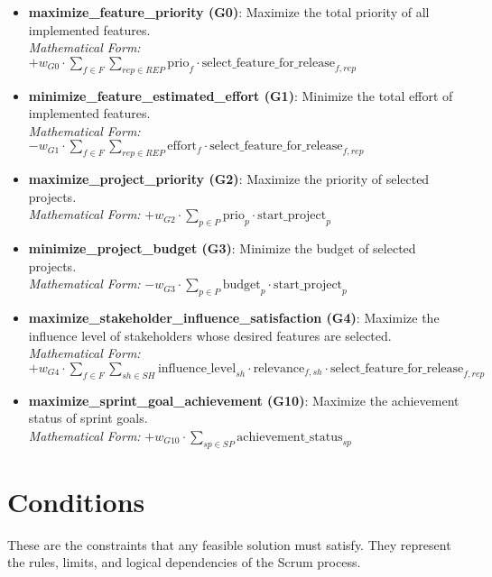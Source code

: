 \documentclass[11pt, a4paper]{article}
\begin{document}
\begin{itemize}
    \item \textbf{maximize\_feature\_priority (G0)}: Maximize the total priority of all implemented features.
    \\ \textit{Mathematical Form:} $+ w_{G0} \cdot \sum_{f \in F} \sum_{rep \in REP} \text{prio}_{f} \cdot \text{select\_feature\_for\_release}_{f,rep}$

    \item \textbf{minimize\_feature\_estimated\_effort (G1)}: Minimize the total effort of implemented features.
    \\ \textit{Mathematical Form:} $- w_{G1} \cdot \sum_{f \in F} \sum_{rep \in REP} \text{effort}_{f} \cdot \text{select\_feature\_for\_release}_{f,rep}$
    
    \item \textbf{maximize\_project\_priority (G2)}: Maximize the priority of selected projects.
    \\ \textit{Mathematical Form:} $+ w_{G2} \cdot \sum_{p \in P} \text{prio}_{p} \cdot \text{start\_project}_{p}$
    
    \item \textbf{minimize\_project\_budget (G3)}: Minimize the budget of selected projects.
    \\ \textit{Mathematical Form:} $- w_{G3} \cdot \sum_{p \in P} \text{budget}_{p} \cdot \text{start\_project}_{p}$
    
    \item \textbf{maximize\_stakeholder\_influence\_satisfaction (G4)}: Maximize the influence level of stakeholders whose desired features are selected.
    \\ \textit{Mathematical Form:} $+ w_{G4} \cdot \sum_{f \in F} \sum_{sh \in SH} \text{influence\_level}_{sh} \cdot \text{relevance}_{f,sh} \cdot \text{select\_feature\_for\_release}_{f,rep}$
    
    \item \textbf{maximize\_sprint\_goal\_achievement (G10)}: Maximize the achievement status of sprint goals.
    \\ \textit{Mathematical Form:} $+ w_{G10} \cdot \sum_{sp \in SP} \text{achievement\_status}_{sp}$
\end{itemize}

\section{Conditions}
\label{sec:conditions}
These are the constraints that any feasible solution must satisfy. They represent the rules, limits, and logical dependencies of the Scrum process.
\end{document}
